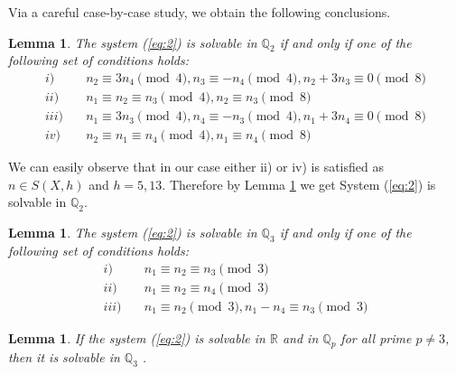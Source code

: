 \documentclass[11pt]{article}
\newcommand{\R}{ {\mathbb{R}} }
\newcommand{\Qp}{ {\mathbb{Q}_p} }
\newtheorem{lemma}[theorem]{Lemma}
\begin{document}
\noindent Via a careful case-by-case study, we obtain the following conclusions. 
\begin{lemma}\label{Q_2localcondn}
The system  (\ref{eq:2}) is solvable in $\mathbb{Q}_{2}$ if and only if one of the following set of conditions holds:
\begin{align*}
i) \quad &n_{2}\equiv 3n_{4}\pmod{4}, n_{3}\equiv -n_{4}\pmod{4}, n_{2}+3n_{3}\equiv 0\pmod{8}\\
ii) \quad &n_{1}\equiv n_{2}\equiv n_{3}\pmod{4}, n_{2}\equiv n_{3}\pmod{8}\\
iii) \quad &n_{1}\equiv 3n_{3}\pmod{4}, n_{4}\equiv -n_{3}\pmod{4}, n_{1}+3n_{4}\equiv 0\pmod{8}\\
iv) \quad &n_{2}\equiv n_{1}\equiv n_{4}\pmod{4}, n_{1}\equiv n_{4}\pmod{8}
\end{align*}
\end{lemma}
\noindent We can easily observe that in our case either ii) or iv) is satisfied as $n\in S(X,h)$ and $h=5,13$. Therefore by Lemma \ref{Q_2localcondn} we get System (\ref{eq:2}) is solvable in  $\mathbb{Q}_{2}$.
\begin{lemma}\label{Q_3localcondn}
The system  (\ref{eq:2}) is solvable in $\mathbb{Q}_{3}$ if and only if one of the following set of conditions holds:
\begin{align*}
i) \quad &n_{1}\equiv n_{2}\equiv n_{3}\pmod{3}\\
ii) \quad &n_{1}\equiv  n_{2}\equiv n_{4}\pmod{3}\\
iii) \quad &n_{1}\equiv  n_{2}\pmod{3}, n_{1}-n_{4}\equiv n_{3}\pmod{3}
\end{align*}
\end{lemma}
\begin{lemma}
If the system (\ref{eq:2}) is solvable in $\R$ and in $\Qp$ for all prime $p\neq 3$, then it is solvable in $\mathbb{Q}_{3}$ .
\end{lemma}
\end{document}
